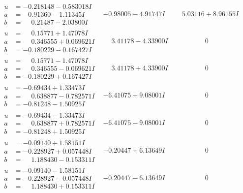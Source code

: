 \documentclass[1p]{elsarticle_modified}
\theoremstyle{definition}
\begin{document}
$$\begin{array}{c|c|c}
\begin{aligned}
u &= -0.218148 - 0.583018 I \\
a &= -0.91360 - 1.11345 I \\
b &= \phantom{-}0.21487 - 2.03800 I\end{aligned}
 & -0.98005 - 4.91747 I & \phantom{-}5.03116 + 8.96155 I \\ \hline\begin{aligned}
u &= \phantom{-}0.15771 + 1.47078 I \\
a &= \phantom{-}0.346555 + 0.069621 I \\
b &= -0.180229 - 0.167427 I\end{aligned}
 & \phantom{-}3.41178 - 4.33900 I & \phantom{-0.000000 } 0 \\ \hline\begin{aligned}
u &= \phantom{-}0.15771 - 1.47078 I \\
a &= \phantom{-}0.346555 - 0.069621 I \\
b &= -0.180229 + 0.167427 I\end{aligned}
 & \phantom{-}3.41178 + 4.33900 I & \phantom{-0.000000 } 0 \\ \hline\begin{aligned}
u &= -0.69434 + 1.33473 I \\
a &= \phantom{-}0.638877 - 0.782571 I \\
b &= -0.81248 - 1.50925 I\end{aligned}
 & -6.41075 + 9.08001 I & \phantom{-0.000000 } 0 \\ \hline\begin{aligned}
u &= -0.69434 - 1.33473 I \\
a &= \phantom{-}0.638877 + 0.782571 I \\
b &= -0.81248 + 1.50925 I\end{aligned}
 & -6.41075 - 9.08001 I & \phantom{-0.000000 } 0 \\ \hline\begin{aligned}
u &= -0.09140 + 1.58151 I \\
a &= -0.228927 + 0.057448 I \\
b &= \phantom{-}1.188430 - 0.153311 I\end{aligned}
 & -0.20447 + 6.13649 I & \phantom{-0.000000 } 0 \\ \hline\begin{aligned}
u &= -0.09140 - 1.58151 I \\
a &= -0.228927 - 0.057448 I \\
b &= \phantom{-}1.188430 + 0.153311 I\end{aligned}
 & -0.20447 - 6.13649 I & \phantom{-0.000000 } 0 \\ \hline\begin{aligned}

\end{aligned}
\end{array}$$
\end{document}
